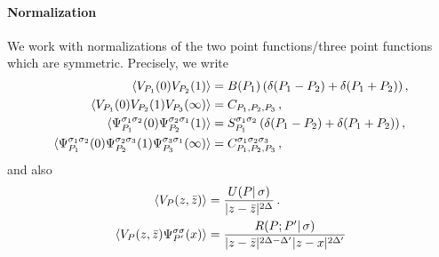 \documentclass[a4paper]{article}
\begin{document}
\paragraph{Normalization} We work with normalizations of the two point functions/three point functions which are symmetric. Precisely, we write
\begin{equation}\label{eq:Normalizations}
\begin{aligned}
  \braket{V_{P_1}(0)V_{P_2}(1)}&=B(P_1)\, (\delta(P_1-P_2)+\delta(P_1+P_2))\,,\\
  \braket{V_{P_1}(0)V_{P_2}(1)V_{P_3}(\infty)}&= C_{P_1,P_2,P_3}\,,\\
  \braket{\Psi_{P_1}^{\sigma_1 \sigma_2}(0)\Psi_{P_2}^{\sigma_2 \sigma_1}(1)}&= S_{P_1}^{\sigma_1 \sigma_2}\, (\delta(P_1-P_2)+\delta(P_1+P_2))\,,\\
  \braket{\Psi_{P_1}^{\sigma_1 \sigma_2}(0)\Psi_{P_2}^{\sigma_2 \sigma_3}(1)\Psi_{P_3}^{\sigma_3 \sigma_1}(\infty)} &= C_{P_1,P_2,P_3}^{\sigma_1 \sigma_2 \sigma_3}\,,\\
\end{aligned}
\end{equation}
and also 
\begin{equation}\label{eq:Normalizationsbis}
\begin{aligned}
  \braket{V_{P}(z,\bar{z})}&=\frac{U(P|\,\sigma)}{|z-\bar{z}|^{2\Delta}}\,.\\
  \braket{V_{P}(z,\bar{z})\Psi_{P'}^{\sigma \sigma}(x)}&=\frac{R(P;P'|\,\sigma)}{|z-\bar{z}|^{2\Delta -\Delta'}|z-x|^{2\Delta'}}
\end{aligned}
\end{equation}
\end{document}
